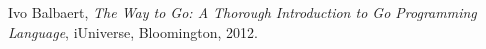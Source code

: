 \begin{thebibliography}{99}

Ivo Balbaert, \textit{The Way to Go: A Thorough Introduction to Go Programming Language}, iUniverse, Bloomington, 2012.
\end{thebibliography}
